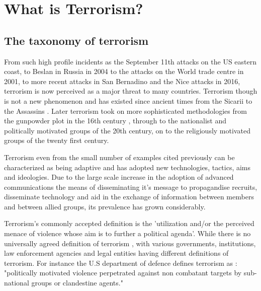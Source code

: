 \chapter{What is Terrorism?}

\section{The taxonomy of terrorism}

From such high profile incidents as the September 11th attacks on the US eastern coast, to Beslan in Russia in 2004 to the attacks on the World trade centre in 2001, to more recent attacks in San Bernadino and the Nice attacks in 2016, terrorism is now perceived as a major threat to many countries. Terrorism though is not a new phenomenon and has existed since ancient times from the Sicarii \citep{horsley1979sicarii} to the Assassins \citep{sloan2009historical}. Later terrorism took on more sophisticated methodologies from the gunpowder plot in the 16th century \citep{fraser2010gunpowder}, through to the nationalist and politically motivated groups of the 20th century, on to the religiously motivated groups of the twenty first century.

Terrorism even from the small number of examples cited previously can be characterized as being adaptive and has adopted new technologies, tactics, aims and ideologies. Due to the large scale increase in the adoption of advanced communications the means of disseminating it's message to propagandise  recruits, disseminate technology and aid in the exchange of information between members and between allied groups, its prevalence has grown considerably.

Terrorism's commonly accepted definition is the 'utilization and/or the perceived menace of violence whose aim is to further a political agenda'. While there is no universally agreed definition of terrorism \citep{ruby2002definition}, with various governments, institutions, law enforcement agencies and legal entities having different definitions of terrorism. For instance the U.S department of defence defines terrorism as \citep{pub1998pub}:
"politically motivated violence perpetrated against non combatant targets by sub-national groups or clandestine agents."

